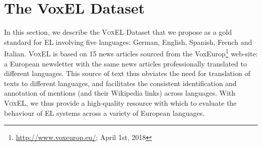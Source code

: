 \documentclass{llncs}
\begin{document}





\section{The VoxEL Dataset} \label{sec:voxel}

In this section, we describe the \textsc{VoxEL} Dataset that we propose as a gold standard for EL involving five languages: German, English, Spanish, French and Italian. \textsc{VoxEL} is based on 15 news articles sourced from the VoxEurop\footnote{\url{http://www.voxeurop.eu/}; April 1st, 2018} web-site: a European newsletter with the same news articles professionally translated to different languages. This source of text thus obviates the need for translation of texts to different languages, and facilitates the consistent identification and annotation of mentions (and their Wikipedia links) across languages. With \textsc{VoxEL}, we thus provide a high-quality resource with which to evaluate the behaviour of EL systems across a variety of European languages. 
\end{document}
